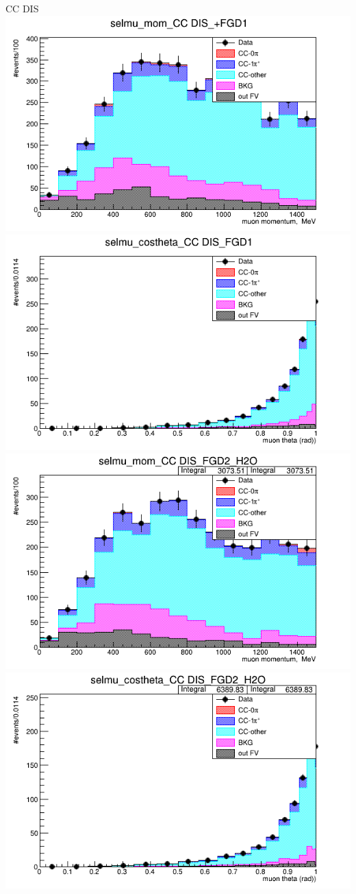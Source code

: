 \documentclass{beamer}
\begin{document}
\begin{frame}{CC DIS}
\center
\includegraphics[width=.45\textwidth]{images/selmu_mom_topology_CC DIS_accum_level[][0][64]_data_mc.png}
\includegraphics[width=.45\textwidth]{images/selmu_costheta_topology_CC DIS_accum_level[][0][64]_data_mc.png}
\includegraphics[width=.45\textwidth]{images/selmu_mom_fgd2topology_CC DIS_accum_level[][1][64] && sample_fgd2layer_xsec==0_data_mc.png}
\includegraphics[width=.45\textwidth]{images/selmu_costheta_fgd2topology_CC DIS_accum_level[][1][64] && sample_fgd2layer_xsec==0_data_mc.png}
\end{frame}
\end{document}
